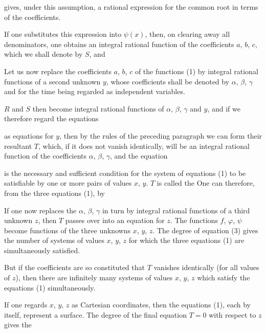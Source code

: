 gives, under this assumption, a rational expression for the common
root in terms of the coefficients.

If one substitutes this expression into $\psi(x)$, then, on clearing
away all denominators, one obtains an integral rational function
of the coefficients $a$, $b$, $c$, which we shall denote by $S$, and

Let us now replace the coefficients $a$, $b$, $c$ of the functions
(1) by integral rational functions of a second unknown
$y$, whose coefficients shall be denoted by $\alpha$, $\beta$, $\gamma$ and for the time being
regarded as independent variables.

$R$ and $S$ then become integral rational functions of
$\alpha$, $\beta$, $\gamma$ and $y$, and if we therefore regard the equations


as equations for $y$, then by the rules of the preceding
paragraph we can form their resultant $T$, which,
if it does not vanish identically, will be an integral rational
function of the coefficients $\alpha$, $\beta$, $\gamma$, and the equation


is the necessary and sufficient condition for the
system of equations (1) to be satisfiable by one or more pairs of values $x$, $y$.
$T$ is called the  %
One can therefore, from the three equations (1), by 

If one now replaces the $\alpha$, $\beta$, $\gamma$ in turn by integral rational
functions of a third unknown $z$, then $T$ passes over into an
equation for $z$. The functions $f$, $\varphi$, $\psi$ become functions
of the three unknowns $x$, $y$, $z$. The degree of equation (3) gives
the number of systems of values $x$, $y$, $z$ for which the three equations
(1) are simultaneously satisfied.

But if the coefficients are so constituted that $T$ vanishes
identically (for all values of $z$), then there are infinitely many
systems of values $x$, $y$, $z$ which satisfy the equations (1) simultaneously.

If one regards $x$, $y$, $z$ as Cartesian coordinates, then
the equations (1), each by itself, represent a surface.
The degree of the final equation $T = 0$ with respect to $z$ gives the
